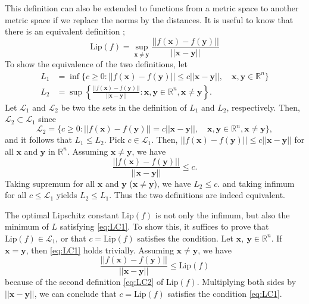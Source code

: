 \documentclass[12pt]{report}
\numberwithin{figure}{chapter}
\theoremstyle{plain}
\theoremstyle{definition}
\theoremstyle{corollary}
\theoremstyle{definition}
\theoremstyle{plain}
\theoremstyle{definition}
\theoremstyle{plain}
\newcommand\bx{\ensuremath{\boldsymbol x}}
\newcommand\by{\ensuremath{\boldsymbol y}}
\newcommand\lip{\ensuremath{\text{Lip}}}
\begin{document}
This definition can also be extended to functions from a metric space to another metric space if we replace the norms by the distances.
It is useful to know that there is an equivalent definition ;
\begin{equation}\label{eq:LC2}
\lip(f)=\sup_{\bx\neq\by}\frac{||f(\bx)-f(\by)||}{||\bx-\by||}
\end{equation}
To show the equivalence of the two definitions, let
\begin{equation}\label{eq:equivalent_def}
\begin{aligned}
L_1&=\inf\{c\ge0:||f(\bx)-f(\by)||\le c||\bx-\by||,\quad\bx,\by\in\mathbb R^n\}\\
L_2&=\sup\left\{\frac{||f(\bx)-f(\by)||}{||\bx-\by||}:\bx,\by\in\mathbb R^n,\bx\neq\by\right\}.
\end{aligned}
\end{equation}
Let \(\mathcal L_1\) and \(\mathcal L_2\) be two the sets in the definition of \(L_1\) and \(L_2\), respectively.
Then, \(\mathcal L_2\subset\mathcal L_1\) since
\[\mathcal L_2=\{c\ge0:||f(\bx)-f(\by)||=c||\bx-\by||,\quad\bx,\by\in\mathbb R^n,\bx\neq\by\},\]
and it follows that \(L_1\le L_2\).
Pick \(c\in\mathcal L_1\).
Then, \(||f(\bx)-f(\by)||\le c||\bx-\by||\) for all \(\bx\) and \(\by\) in \(\mathbb R^n\).
Assuming \(\bx\neq \by\), we have
\[
\frac{||f(\bx)-f(\by)||}{||\bx-\by||}\le c.
\]
Taking supremum for all \bx{} and \by{} (\(\bx\neq\by\)), we have \(L_2\le c.\) and taking infimum for all \(c\le\mathcal L_1\) yields \(L_2\le L_1\).
Thus the two definitions are indeed equivalent.

The optimal Lipschitz constant \(\lip(f)\) is not only the infimum, but also the minimum of \(L\) satisfying \eqref{eq:LC1}.
To show this, it suffices to prove that \(\lip(f)\in\mathcal L_1\), or that \(c=\lip(f)\) satisfies the condition.
Let \(\bx,\:\by\in\mathbb R^n\).
If \(\bx=\by\), then \eqref{eq:LC1} holds trivially.
Assuming \(\bx\neq\by\), we have
\[
\frac{||f(\bx)-f(\by)||}{||\bx-\by||}\le\lip(f)
\]
because of the second definition \eqref{eq:LC2} of \(\lip(f)\).
Multiplying both sides by \(||\bx-\by||\), we can conclude that \(c=\lip(f)\) satisfies the condition \eqref{eq:LC1}.
\end{document}
